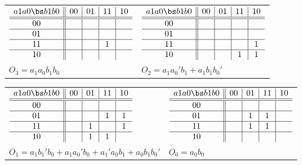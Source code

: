 \begin{enumerate}
\begin{itemize}
\begin{solution}{
\begin{tabular}{ll}
$\begin{array} {c||c|c|c|c}
 a1 a0 \bs b1 b0 & 00 & 01 & 11 & 10 \\ \hline \hline
       00        &    &    &    &    \\ \hline
       01        &    &    &    &    \\ \hline
       11        &    &    & 1  &    \\ \hline
       10        &    &    &    &    \\
\end{array}$ &
$\begin{array} {c||c|c|c|c}
 a1 a0 \bs b1 b0 & 00 & 01 & 11 & 10 \\ \hline \hline
       00        &    &    &    &    \\ \hline
       01        &    &    &    &    \\ \hline
       11        &    &    &    & 1  \\ \hline
       10        &    &    & 1  & 1  \\
\end{array} $ \\
$O_3 = a_1a_0b_1b_0$ & $O_2 = a_1a_0'b_1 + a_1b_1b_0'$\\
\end{tabular}
} \end{solution}


\begin{solution}{
\begin{tabular}{ll}
$\begin{array} {c||c|c|c|c}
 a1 a0 \bs b1 b0 & 00 & 01 & 11 & 10 \\ \hline \hline
       00        &    &    &    &    \\ \hline
       01        &    &    & 1  & 1  \\ \hline
       11        &    & 1  &    & 1  \\ \hline
       10        &    & 1  & 1  &    \\
\end{array}$ &
$\begin{array} {c||c|c|c|c}
 a1 a0 \bs b1 b0 & 00 & 01 & 11 & 10 \\ \hline \hline
       00        &    &    &    &    \\ \hline
       01        &    & 1  & 1  &    \\ \hline
       11        &    & 1  & 1  &    \\ \hline
       10        &    &    &    &    \\
\end{array}$ \\
$O_1 = a_1b_1'b_0 + a_1a_0'b_0 + a_1'a_0b_1+a_0b_1b_0'$ & $O_0 = a_0b_0$ \\
\end{tabular}
} \end{solution}


\end{itemize}
\end{enumerate}
